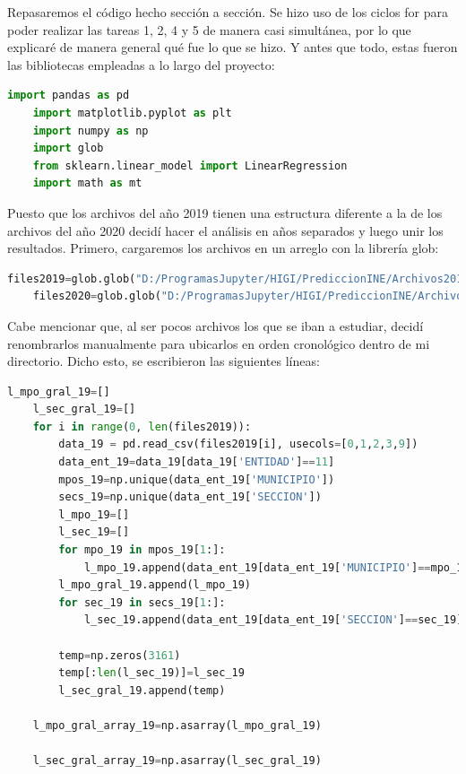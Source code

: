 \documentclass[12pt,letterpaper]{article}
\begin{document}
Repasaremos el código hecho sección a sección. Se hizo uso de los ciclos for para poder realizar las tareas 1, 2, 4 y 5 de manera casi simultánea, por lo que explicaré de manera general qué fue lo que se hizo. Y antes que todo, estas fueron las bibliotecas empleadas a lo largo del proyecto:
\scriptsize{\begin{lstlisting}[language=Python]
    import pandas as pd 
    import matplotlib.pyplot as plt 
    import numpy as np
    import glob
    from sklearn.linear_model import LinearRegression
    import math as mt
\end{lstlisting}}
\normalsize{Puesto que los archivos del año 2019 tienen una estructura diferente a la de los archivos del año 2020 decidí hacer el análisis en años separados y luego unir los resultados. Primero, cargaremos los archivos en un arreglo con la librería glob:}
\scriptsize{\begin{lstlisting}[language=Python]
    files2019=glob.glob("D:/ProgramasJupyter/HIGI/PrediccionINE/Archivos2019/*.txt")
    files2020=glob.glob("D:/ProgramasJupyter/HIGI/PrediccionINE/Archivos2020/*.txt")
\end{lstlisting}}
\normalsize{Cabe mencionar que, al ser pocos archivos los que se iban a estudiar, decidí renombrarlos manualmente para ubicarlos en orden cronológico dentro de mi directorio. Dicho esto, se escribieron las siguientes líneas:} 
\scriptsize{\begin{lstlisting}[language=Python]
    l_mpo_gral_19=[]
    l_sec_gral_19=[]
    for i in range(0, len(files2019)):
        data_19 = pd.read_csv(files2019[i], usecols=[0,1,2,3,9])
        data_ent_19=data_19[data_19['ENTIDAD']==11]
        mpos_19=np.unique(data_ent_19['MUNICIPIO'])
        secs_19=np.unique(data_ent_19['SECCION'])
        l_mpo_19=[]
        l_sec_19=[]
        for mpo_19 in mpos_19[1:]:
            l_mpo_19.append(data_ent_19[data_ent_19['MUNICIPIO']==mpo_19]['LISTA'].sum())
        l_mpo_gral_19.append(l_mpo_19)
        for sec_19 in secs_19[1:]:
            l_sec_19.append(data_ent_19[data_ent_19['SECCION']==sec_19]['LISTA'].sum())
        
        temp=np.zeros(3161)
        temp[:len(l_sec_19)]=l_sec_19
        l_sec_gral_19.append(temp)
        
    l_mpo_gral_array_19=np.asarray(l_mpo_gral_19)
    
    l_sec_gral_array_19=np.asarray(l_sec_gral_19)
\end{lstlisting}}
\end{document}
